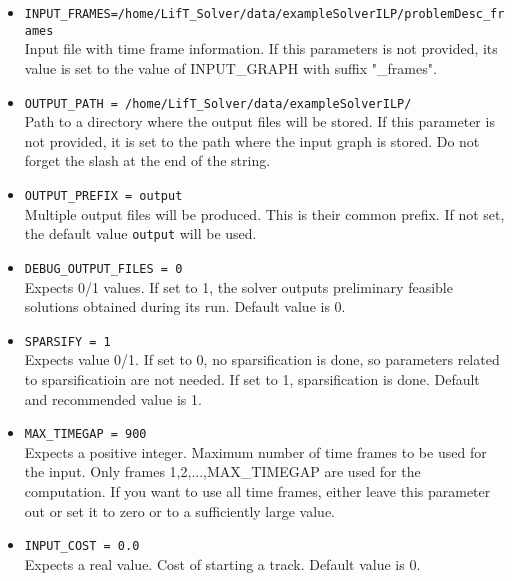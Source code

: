 \documentclass[a4paper,10pt]{article}
\begin{document}
 \begin{itemize} 
 
 \item  \texttt{INPUT\_FRAMES=/home/LifT\_Solver/data/exampleSolverILP/problemDesc\_frames}\\
 Input file with time frame information. If this parameters is not provided, its value is set to the value of INPUT\_GRAPH with suffix "\_frames".
  \item \texttt{OUTPUT\_PATH = /home/LifT\_Solver/data/exampleSolverILP/}\\
 Path to a directory where the output files will be stored. If this parameter is not provided, it is set to the path where the input graph is stored. Do not forget the slash at the end of the string.
 
 \item \texttt{OUTPUT\_PREFIX = output} \\
 Multiple output files will be produced. This is their common prefix. If not set, the default value \texttt{output} will be used.
 
 \item  \texttt{DEBUG\_OUTPUT\_FILES = 0} \\
 Expects 0/1 values. If set to 1, the solver outputs preliminary feasible solutions obtained during its run. Default value is 0.
 
 \item  \texttt{SPARSIFY = 1} \\
 Expects value 0/1. If set to 0, no sparsification is done, so parameters related to sparsificatioin are not needed. If set to 1, sparsification is done. Default and recommended value is 1.
 

 
 \item  \texttt{MAX\_TIMEGAP = 900} \\
 Expects a positive integer. Maximum number of time frames to be used for the input. Only frames 1,2,...,MAX\_TIMEGAP are used for the computation. If you want to use all time frames, either leave this parameter out or set it to zero or to a sufficiently large value. 
 
 \item  \texttt{INPUT\_COST = 0.0}\\
Expects a real value. Cost of starting a track. Default value is 0. 
 

\end{itemize}
\end{document}
